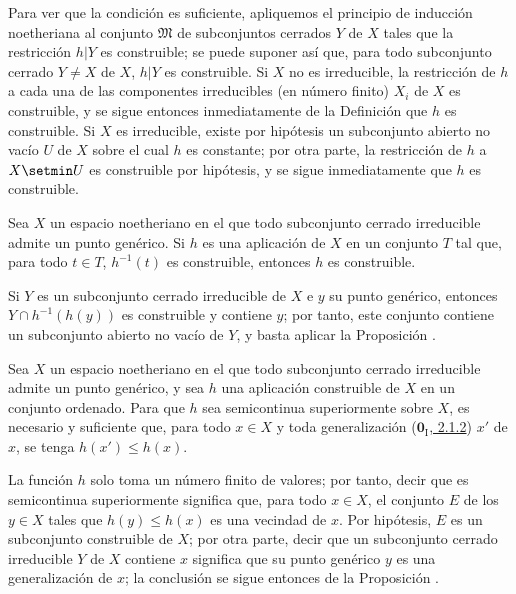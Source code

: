 Para ver que la condición es suficiente, apliquemos el principio de inducción noetheriana al conjunto $\mathfrak{M}$ de subconjuntos cerrados $Y$ de $X$ tales que la restricción $h|Y$ es construible; se puede suponer así que, para todo subconjunto cerrado $Y\ne X$ de $X$,
$h|Y$ es construible.
Si $X$ no es irreducible, la restricción de $h$ a cada una de las componentes irreducibles (en número finito) $X_i$ de $X$ es construible, y se sigue entonces inmediatamente de la Definición  que $h$ es construible.
Si $X$ es irreducible, existe por hipótesis un subconjunto abierto no vacío $U$ de $X$ sobre el cual $h$ es constante; por otra parte, la restricción de $h$ a $X\setmin U$ es construible por hipótesis, y se sigue inmediatamente que $h$ es construible.


\begin{corollary}[9.3.3]
\label{0.9.3.3}
\label{0.9.3.3-fr}
Sea $X$ un espacio noetheriano en el que todo subconjunto cerrado irreducible admite un punto genérico.
Si $h$ es una aplicación de $X$ en un conjunto $T$ tal que, para todo $t\in T$, $h^{-1}(t)$ es construible, entonces $h$ es construible.
\end{corollary}


Si $Y$ es un subconjunto cerrado irreducible de $X$ e $y$ su punto genérico, entonces $Y\cap h^{-1}(h(y))$ es construible y contiene $y$; por tanto,  este conjunto contiene un subconjunto abierto no vacío de $Y$, y basta aplicar la Proposición .


\begin{proposition}[9.3.4]
\label{0.9.3.4}
\label{0.9.3.4-fr}
Sea $X$ un espacio noetheriano en el que todo subconjunto cerrado irreducible admite un punto genérico, y sea $h$ una aplicación construible de $X$ en un conjunto ordenado.
Para que $h$ sea semicontinua superiormente sobre $X$, es necesario y suficiente que, para todo $x\in X$ y toda generalización \textup{(\hyperref[0.2.1.2-fr]{$\mathbf{0}_{\mathrm I}$, 2.1.2})} $x'$ de $x$, se tenga $h(x')\leq h(x)$.
\end{proposition}


La función $h$ solo toma un número finito de valores; por tanto, decir que es semicontinua superiormente significa que, para todo $x\in X$, el conjunto $E$ de los $y\in X$ tales que $h(y)\leq h(x)$ es una vecindad de $x$.
Por hipótesis, $E$ es un subconjunto construible de $X$; por otra parte, decir que un subconjunto cerrado irreducible $Y$ de $X$ contiene $x$ significa que su punto genérico $y$ es una generalización de $x$; la conclusión se sigue entonces de la Proposición .

